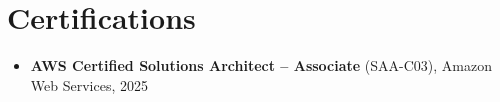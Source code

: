 \documentclass[11pt,a4paper,sans]{moderncv}
\begin{document}

\section{Certifications}
\vspace{1pt}
\begin{itemize}
\item{\textbf{AWS Certified Solutions Architect -- Associate} (SAA-C03), Amazon Web Services, 2025}
\end{itemize}

\end{document}
